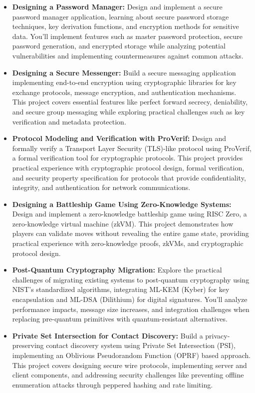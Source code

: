 \documentclass[10pt,a4paper,american]{exam}
\begin{document}
\begin{itemize}
	\item \textbf{Designing a Password Manager:} Design and implement a secure password manager application, learning about secure password storage techniques, key derivation functions, and encryption methods for sensitive data. You'll implement features such as master password protection, secure password generation, and encrypted storage while analyzing potential vulnerabilities and implementing countermeasures against common attacks.
	\item \textbf{Designing a Secure Messenger:} Build a secure messaging application implementing end-to-end encryption using cryptographic libraries for key exchange protocols, message encryption, and authentication mechanisms. This project covers essential features like perfect forward secrecy, deniability, and secure group messaging while exploring practical challenges such as key verification and metadata protection.
	\item \textbf{Protocol Modeling and Verification with ProVerif:} Design and formally verify a Transport Layer Security (TLS)-like protocol using ProVerif, a formal verification tool for cryptographic protocols. This project provides practical experience with cryptographic protocol design, formal verification, and security property specification for protocols that provide confidentiality, integrity, and authentication for network communications.
	\item \textbf{Designing a Battleship Game Using Zero-Knowledge Systems:} Design and implement a zero-knowledge battleship game using RISC Zero, a zero-knowledge virtual machine (zkVM). This project demonstrates how players can validate moves without revealing the entire game state, providing practical experience with zero-knowledge proofs, zkVMs, and cryptographic protocol design.
	\item \textbf{Post-Quantum Cryptography Migration:} Explore the practical challenges of migrating existing systems to post-quantum cryptography using NIST's standardized algorithms, integrating ML-KEM (Kyber) for key encapsulation and ML-DSA (Dilithium) for digital signatures. You'll analyze performance impacts, message size increases, and integration challenges when replacing pre-quantum primitives with quantum-resistant alternatives.
	\item \textbf{Private Set Intersection for Contact Discovery:} Build a privacy-preserving contact discovery system using Private Set Intersection (PSI), implementing an Oblivious Pseudorandom Function (OPRF) based approach. This project covers designing secure wire protocols, implementing server and client components, and addressing security challenges like preventing offline enumeration attacks through peppered hashing and rate limiting.

\end{itemize}
\end{document}
